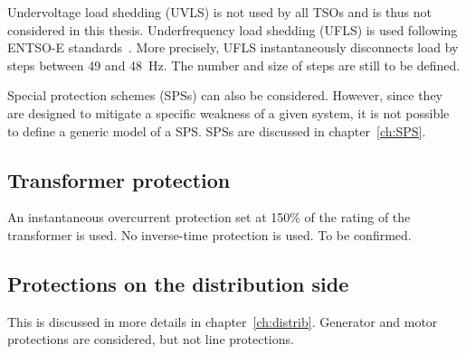 Undervoltage load shedding (UVLS) is not used by all TSOs and is thus not considered in this thesis. Underfrequency load shedding (UFLS) is used following ENTSO-E standards~\cite{ENTSOE-UFLS}. More precisely, UFLS instantaneously disconnects load by steps between 49 and 48~Hz. The number and size of steps are still to be defined.

Special protection schemes (SPSs) can also be considered. However, since they are designed to mitigate a specific weakness of a given system, it is not possible to define a generic model of a SPS. SPSs are discussed in chapter~\ref{ch:SPS}.

\subsection{Transformer protection}

An instantaneous overcurrent protection set at 150\% of the rating of the transformer is used. No inverse-time protection is used. To be confirmed.

\subsection{Protections on the distribution side}

This is discussed in more details in chapter~\ref{ch:distrib}. Generator and motor protections are considered, but not line protections.
